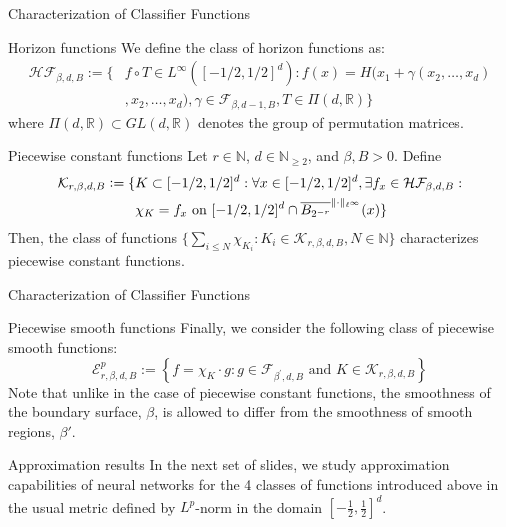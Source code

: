 \documentclass{if-beamer}
\newcommand{\defeq}{\vcentcolon=}
\begin{document}
\begin{frame}{Characterization of Classifier Functions}
    \begin{block}{Horizon functions}
        {\small
        We define the class of horizon functions as:
        \begin{align*}
            \mathcal{H F}_{\beta, d, B} := \{&f \circ T \in L^{\infty}\left([-1 / 2,1 / 2]^{d}\right): f(x)=H(x_{1}+\gamma\left(x_{2}, \ldots, x_{d}\right)\\ &,x_{2}, \ldots, x_{d}), \gamma \in \mathcal{F}_{\beta, d-1, B}, T \in \Pi(d, \mathbb{R})\}
        \end{align*}
        where $\Pi(d, \mathbb{R}) \subset G L(d, \mathbb{R})$ denotes the group of permutation matrices.
        }
    \end{block}
    \begin{block}{Piecewise constant functions}
        {\small
        Let $r \in \mathbb{N}$, $d \in \mathbb{N}_{\geq 2}$, and $\beta, B>0$. Define 
        \begin{align*}
            \mathcal{K}_{r, \beta, d, B}\defeq\{&K \subset[-1 / 2,1 / 2]^{d}: \forall x \in[-1 / 2,1 / 2]^{d}, \exists f_{x} \in \mathcal{H} \mathcal{F}_{\beta, d, B}:\\ &\chi_{K}=f_{x} \text { on }[-1 / 2,1 / 2]^{d} \cap \overline{B_{2^{-r}}}^{\|\cdot\|_{\ell^{\infty}}}(x)\}
        \end{align*}
        Then, the class of functions $\{\sum_{i \leq N}\chi_{K_i} : K_i \in \mathcal{K}_{r, \beta, d, B}, N \in \mathbb{N}\}$ characterizes piecewise constant functions.
        }
    \end{block}
\end{frame}

\begin{frame}{Characterization of Classifier Functions}
    \begin{block}{Piecewise smooth functions}
        Finally, we consider the following class of piecewise smooth functions:
        $$
        \mathcal{E}_{r, \beta, d, B}^{p}:=\left\{f=\chi_{K} \cdot g: g \in \mathcal{F}_{\beta^{\prime}, d, B} \text { and } K \in \mathcal{K}_{r, \beta, d, B}\right\}
        $$
        Note that unlike in the case of piecewise constant functions, the smoothness of the boundary surface, $\beta$, is allowed to differ from the smoothness of smooth regions, $\beta'$.
    \end{block}
    \begin{block}{Approximation results}
        In the next set of slides, we study approximation capabilities of neural networks for the 4 classes of functions introduced above in the usual metric defined by $L^p$-norm in the domain $\left[-\frac{1}{2}, \frac{1}{2}\right]^d$.
    \end{block}
\end{frame}
\end{document}
